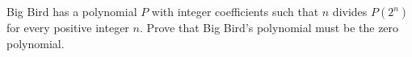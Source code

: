 Big Bird has a polynomial $P$ with integer coefficients such that $n$ divides $P(2^n)$ for every positive integer $n$. Prove that Big Bird's polynomial must be the zero polynomial.